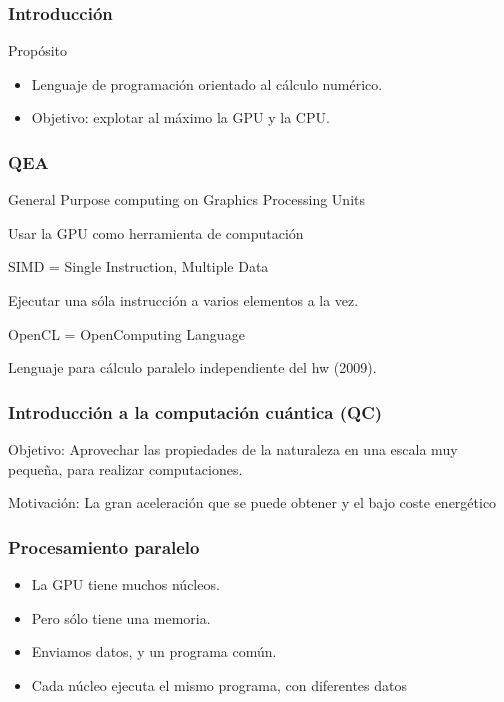 \documentclass{beamer}
\begin{document}
\begin{frame}
\frametitle{Introducción}
\begin{block}{Propósito}
\begin{itemize}
\item Lenguaje de programación orientado al cálculo numérico.
\item Objetivo: explotar al máximo la GPU y la CPU.
\end{itemize}
\end{block}
\end{frame}

\begin{frame}
\frametitle{QEA}


General	Purpose computing on Graphics Processing Units

Usar la GPU como herramienta de computación

\pause

SIMD = Single Instruction, Multiple Data

Ejecutar una sóla instrucción a varios elementos a la vez.

\pause

OpenCL = OpenComputing Language

Lenguaje para cálculo paralelo independiente del hw (2009).


\end{frame}



\begin{frame}
\frametitle{Introducción a la computación cuántica (QC)}
Objetivo: Aprovechar las propiedades de la naturaleza en una escala muy pequeña, 
para realizar computaciones.

\pause

Motivación: La gran aceleración que se puede obtener y el bajo coste energético

\end{frame}



\begin{frame}
\frametitle{Procesamiento paralelo}

\begin{itemize}
\item La GPU tiene muchos núcleos.
\item Pero sólo tiene una memoria.
\item Enviamos datos, y un programa común.
\item Cada núcleo ejecuta el mismo programa, con diferentes datos
\end{itemize}

\end{frame}
\end{document}
